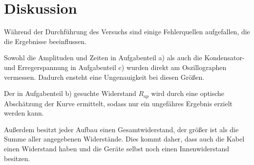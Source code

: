 \section{Diskussion}
\label{sec:Diskussion}
Während der Durchführung des Versuchs sind einige Fehlerquellen aufgefallen, die die Ergebnisse beeinflussen.

\noindent
Sowohl die Amplituden und Zeiten in Aufgabenteil a) als auch die Kondensator- und Erregerspannung in Aufgabenteil c) 
wurden direkt am Oszillographen vermessen.
Dadurch ensteht eine Ungenauigkeit bei diesen Größen.

\noindent
Der in Aufgabenteil b) gesuchte Widerstand $R_{ap}$ wird durch eine optische Abschätzung der Kurve ermittelt,
sodass nur ein ungefähres Ergebnis erzielt werden kann.

\noindent
Außerdem besitzt jeder Aufbau einen Gesamtwiderstand, der größer ist als die Summe aller angegebenen Widerstände.
Dies kommt daher, dass auch die Kabel einen Widerstand haben und die Geräte selbst noch einen Innenwiderstand besitzen.